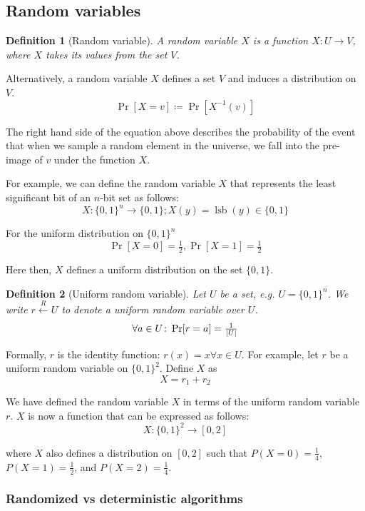\documentclass[10pt,a4paper]{report}
\newtheorem{definition}{Definition}[section]
\begin{document}
\subsection{Random variables}

\begin{definition}[Random variable]
    A random variable $X$ is a function $X \colon U \to V$, where $X$ takes its values from the set
    $V$.
\end{definition}

Alternatively, a random variable $X$ defines a set $V$ and induces a distribution on $V$.
    $$ \operatorname{Pr}[X = v] \coloneqq \operatorname{Pr}[X^{-1}(v)] $$

The right hand side of the equation above describes the probability of the event that when we
sample a random element in the universe, we fall into the pre-image of $v$ under the function $X$.

For example, we can define the random variable $X$ that represents the least significant bit of an
$n$-bit set as follows:
    $$ X \colon \{0, 1\}^n \to \{0, 1\}; X(y) = \operatorname{lsb}(y) \in \{0, 1\} $$

For the uniform distribution on $\{0, 1\}^n$
    $$ \operatorname{Pr}[X = 0] = \tfrac{1}{2}, \operatorname{Pr}[X = 1] = \tfrac{1}{2} $$

Here then, $X$ defines a uniform distribution on the set $\{0, 1\}$.

\begin{definition}[Uniform random variable]
    Let $U$ be a set, e.g. $U = \{0, 1\}^n$. We write $r \xleftarrow{R} U$ to denote a uniform
    random variable over $U$.
    $$ \forall a \in U \colon \operatorname{Pr}[r = a] = \tfrac{1}{\abs{U}} $$
\end{definition}

Formally, $r$ is the identity function: $r(x) = x \forall x \in U$. For example, let $r$ be a
uniform random variable on $\{0, 1\}^2$. Define $X$ as
    $$ X = r_1 + r_2 $$

We have defined the random variable $X$ in terms of the uniform random variable $r$. $X$ is now a
function that can be expressed as follows:
    $$ X \colon \{0, 1\}^2 \to [0, 2] $$

where $X$ also defines a distribution on $[0, 2]$ such that $P(X = 0) = \tfrac{1}{4}$,
$P(X = 1) = \tfrac{1}{2}$, and $P(X = 2) = \tfrac{1}{4}$.

\subsubsection*{Randomized vs deterministic algorithms}
\end{document}
